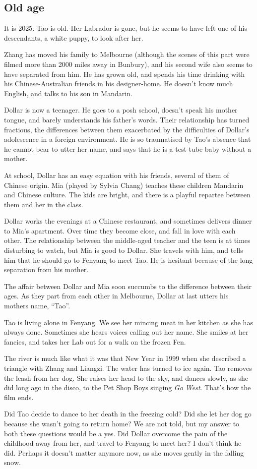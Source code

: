 \documentclass{article}
\begin{document}
\subsection{Old age}
\label{sec:7wgsj9bn}

It is 2025.  Tao is old.  Her Labrador is gone, but he seems to have
left one of his descendants, a white puppy, to look after her.

Zhang has moved his family to Melbourne (although the scenes of this
part were filmed more than 2000 miles away in Bunbury), and his second
wife also seems to have separated from him.  He has grown old, and
spends his time drinking with his Chinese-Australian friends in his
designer-home.  He doesn't know much English, and talks to his son in
Mandarin.

Dollar is now a teenager.  He goes to a posh school, doesn't speak his
mother tongue, and barely understands his father's words.  Their
relationship has turned fractious, the differences between them
exacerbated by the difficulties of Dollar's adolescence in a foreign
environment.  He is so traumatised by Tao's absence that he cannot
bear to utter her name, and says that he is a test-tube baby without a
mother.

At school, Dollar has an easy equation with his friends, several of
them of Chinese origin.  Mia (played by Sylvia Chang) teaches these
children Mandarin and Chinese culture.  The kids are bright, and there
is a playful repartee between them and her in the class.

Dollar works the evenings at a Chinese restaurant, and sometimes
delivers dinner to Mia's apartment.  Over time they become close, and
fall in love with each other.  The relationship between the
middle-aged teacher and the teen is at times disturbing to watch, but
Mia is good to Dollar.  She travels with him, and tells him that he
should go to Fenyang to meet Tao.  He is hesitant because of the long
separation from his mother.

The affair between Dollar and Mia soon succumbs to the difference
between their ages.  As they part from each other in Melbourne, Dollar
at last utters his mothers name, ``Tao''.

Tao is living alone in Fenyang.  We see her mincing meat in her
kitchen as she has always done.  Sometimes she hears voices calling
out her name.  She smiles at her fancies, and takes her Lab out for a
walk on the frozen Fen.

The river is much like what it was that New Year in 1999 when she
described a triangle with Zhang and Liangzi.  The water has turned to
ice again.  Tao removes the leash from her dog.  She raises her head
to the sky, and dances slowly, as she did long ago in the disco, to
the Pet Shop Boys singing \emph{Go West}.  That's how the film ends.

Did Tao decide to dance to her death in the freezing cold? Did she let
her dog go because she wasn't going to return home?  We are not told,
but my answer to both these questions would be a yes.  Did Dollar
overcome the pain of the childhood away from her, and travel to
Fenyang to meet her?  I don't think he did.  Perhaps it doesn't matter
anymore now, as she moves gently in the falling snow.

\bibsection
\end{document}
